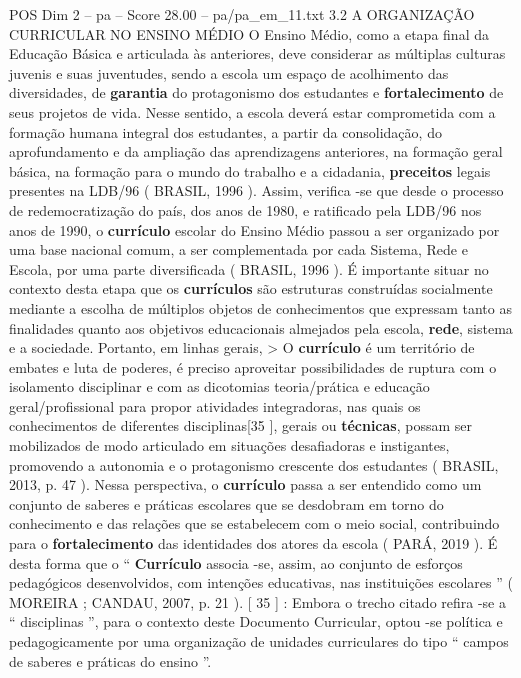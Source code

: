 \begin{textsample}{POS Dim 2 – pa – Score 28.00 – pa/pa\_em\_11.txt}  \label{ex:f2_pos_065}
3.2 A ORGANIZAÇÃO CURRICULAR NO ENSINO MÉDIO O Ensino Médio, como a etapa final da Educação Básica e articulada às anteriores, deve considerar as múltiplas culturas juvenis e suas juventudes, sendo a escola um espaço de acolhimento das diversidades, de \textbf{garantia} do protagonismo dos estudantes e \textbf{fortalecimento} de seus projetos de vida.
Nesse sentido, a escola deverá estar comprometida com a formação humana integral dos estudantes, a partir da consolidação, do aprofundamento e da ampliação das aprendizagens anteriores, na formação geral básica, na formação para o mundo do trabalho e a cidadania, \textbf{preceitos} legais presentes na LDB/96 ( BRASIL, 1996 ).
Assim, verifica -se que desde o processo de redemocratização do país, dos anos de 1980, e ratificado pela LDB/96 nos anos de 1990, o \textbf{currículo} escolar do Ensino Médio passou a ser organizado por uma base nacional comum, a ser complementada por cada Sistema, Rede e Escola, por uma parte diversificada ( BRASIL, 1996 ).
É importante situar no contexto desta etapa que os \textbf{currículos} são estruturas construídas socialmente mediante a escolha de múltiplos objetos de conhecimentos que expressam tanto as finalidades quanto aos objetivos educacionais almejados pela escola, \textbf{rede}, sistema e a sociedade.
Portanto, em linhas gerais, > O \textbf{currículo} é um território de embates e luta de poderes, é preciso aproveitar possibilidades de ruptura com o isolamento disciplinar e com as dicotomias teoria/prática e educação geral/profissional para propor atividades integradoras, nas quais os conhecimentos de diferentes disciplinas[35 ], gerais ou \textbf{técnicas}, possam ser mobilizados de modo articulado em situações desafiadoras e instigantes, promovendo a autonomia e o protagonismo crescente dos estudantes ( BRASIL, 2013, p. 47 ).
Nessa perspectiva, o \textbf{currículo} passa a ser entendido como um conjunto de saberes e práticas escolares que se desdobram em torno do conhecimento e das relações que se estabelecem com o meio social, contribuindo para o \textbf{fortalecimento} das identidades dos atores da escola ( PARÁ, 2019 ).
É desta forma que o “ \textbf{Currículo} associa -se, assim, ao conjunto de esforços pedagógicos desenvolvidos, com intenções educativas, nas instituições escolares ” ( MOREIRA ; CANDAU, 2007, p. 21 ). [ 35 ] : Embora o trecho citado refira -se a “ disciplinas ”, para o contexto deste Documento Curricular, optou -se política e pedagogicamente por uma organização de unidades curriculares do tipo “ campos de saberes e práticas do ensino ”.

\end{textsample}
